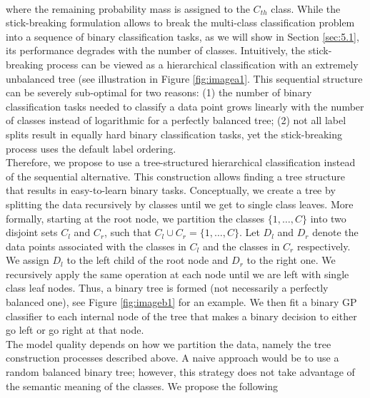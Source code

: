 \documentclass[preprint,11pt]{elsarticle}
\begin{document}
        \\
        where the remaining probability mass is assigned to the $C_{th}$
        class. While the stick-breaking formulation allows to break
        the multi-class classification problem into a sequence of
        binary classification tasks, as we will show in Section \ref{sec:5.1},        its performance degrades with the number of classes. Intuitively,
        the stick-breaking process can be viewed as a hierarchical
        classification with an extremely unbalanced tree
        (see illustration in Figure \ref{fig:imagea1}. This sequential structure
        can be severely sub-optimal for two reasons: (1) the number
        of binary classification tasks needed to classify a data
        point grows linearly with the number of classes instead of
        logarithmic for a perfectly balanced tree; (2) not all label
        splits result in equally hard binary classification tasks, yet
        the stick-breaking process uses the default label ordering.
        \\
        Therefore, we propose to use a tree-structured hierarchical
        classification instead of the sequential alternative. This
        construction allows finding a tree structure that results in
        easy-to-learn binary tasks. Conceptually, we create a tree
        by splitting the data recursively by classes until we get to
        single class leaves. More formally, starting at the root node,
        we partition the classes $\{1,\ldots,C\}$ into two disjoint sets $C_l$
        and $C_r$, such that $C_l \cup C_r = \{1,\ldots,C\}$. Let $D_l$ and $D_r$
        denote the data points associated with the classes in $C_l$ and
        the classes in $C_r$ respectively. We assign $D_l$ to the left child
        of the root node and $D_r$ to the right one. We recursively
        apply the same operation at each node until we are left with
        single class leaf nodes. Thus, a binary tree is formed (not
        necessarily a perfectly balanced one), see Figure \ref{fig:imageb1} for an
        example. We then fit a binary GP classifier to each internal
        node of the tree that makes a binary decision to either go
        left or go right at that node.
        \\
        The model quality depends on how we partition the data,
        namely the tree construction processes described above. A
        naive approach would be to use a random balanced binary
        tree; however, this strategy does not take advantage of the
        semantic meaning of the classes. We propose the following
\end{document}
